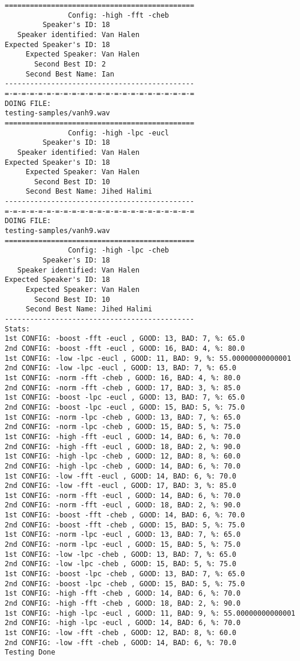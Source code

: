 \begin{verbatim}
=============================================
               Config: -high -fft -cheb
         Speaker's ID: 18
   Speaker identified: Van Halen
Expected Speaker's ID: 18
     Expected Speaker: Van Halen
       Second Best ID: 2
     Second Best Name: Ian
---------------------------------------------
=-=-=-=-=-=-=-=-=-=-=-=-=-=-=-=-=-=-=-=-=-=-=
DOING FILE:
testing-samples/vanh9.wav
=============================================
               Config: -high -lpc -eucl
         Speaker's ID: 18
   Speaker identified: Van Halen
Expected Speaker's ID: 18
     Expected Speaker: Van Halen
       Second Best ID: 10
     Second Best Name: Jihed Halimi
---------------------------------------------
=-=-=-=-=-=-=-=-=-=-=-=-=-=-=-=-=-=-=-=-=-=-=
DOING FILE:
testing-samples/vanh9.wav
=============================================
               Config: -high -lpc -cheb
         Speaker's ID: 18
   Speaker identified: Van Halen
Expected Speaker's ID: 18
     Expected Speaker: Van Halen
       Second Best ID: 10
     Second Best Name: Jihed Halimi
---------------------------------------------
Stats:
1st CONFIG: -boost -fft -eucl , GOOD: 13, BAD: 7, %: 65.0
2nd CONFIG: -boost -fft -eucl , GOOD: 16, BAD: 4, %: 80.0
1st CONFIG: -low -lpc -eucl , GOOD: 11, BAD: 9, %: 55.00000000000001
2nd CONFIG: -low -lpc -eucl , GOOD: 13, BAD: 7, %: 65.0
1st CONFIG: -norm -fft -cheb , GOOD: 16, BAD: 4, %: 80.0
2nd CONFIG: -norm -fft -cheb , GOOD: 17, BAD: 3, %: 85.0
1st CONFIG: -boost -lpc -eucl , GOOD: 13, BAD: 7, %: 65.0
2nd CONFIG: -boost -lpc -eucl , GOOD: 15, BAD: 5, %: 75.0
1st CONFIG: -norm -lpc -cheb , GOOD: 13, BAD: 7, %: 65.0
2nd CONFIG: -norm -lpc -cheb , GOOD: 15, BAD: 5, %: 75.0
1st CONFIG: -high -fft -eucl , GOOD: 14, BAD: 6, %: 70.0
2nd CONFIG: -high -fft -eucl , GOOD: 18, BAD: 2, %: 90.0
1st CONFIG: -high -lpc -cheb , GOOD: 12, BAD: 8, %: 60.0
2nd CONFIG: -high -lpc -cheb , GOOD: 14, BAD: 6, %: 70.0
1st CONFIG: -low -fft -eucl , GOOD: 14, BAD: 6, %: 70.0
2nd CONFIG: -low -fft -eucl , GOOD: 17, BAD: 3, %: 85.0
1st CONFIG: -norm -fft -eucl , GOOD: 14, BAD: 6, %: 70.0
2nd CONFIG: -norm -fft -eucl , GOOD: 18, BAD: 2, %: 90.0
1st CONFIG: -boost -fft -cheb , GOOD: 14, BAD: 6, %: 70.0
2nd CONFIG: -boost -fft -cheb , GOOD: 15, BAD: 5, %: 75.0
1st CONFIG: -norm -lpc -eucl , GOOD: 13, BAD: 7, %: 65.0
2nd CONFIG: -norm -lpc -eucl , GOOD: 15, BAD: 5, %: 75.0
1st CONFIG: -low -lpc -cheb , GOOD: 13, BAD: 7, %: 65.0
2nd CONFIG: -low -lpc -cheb , GOOD: 15, BAD: 5, %: 75.0
1st CONFIG: -boost -lpc -cheb , GOOD: 13, BAD: 7, %: 65.0
2nd CONFIG: -boost -lpc -cheb , GOOD: 15, BAD: 5, %: 75.0
1st CONFIG: -high -fft -cheb , GOOD: 14, BAD: 6, %: 70.0
2nd CONFIG: -high -fft -cheb , GOOD: 18, BAD: 2, %: 90.0
1st CONFIG: -high -lpc -eucl , GOOD: 11, BAD: 9, %: 55.00000000000001
2nd CONFIG: -high -lpc -eucl , GOOD: 14, BAD: 6, %: 70.0
1st CONFIG: -low -fft -cheb , GOOD: 12, BAD: 8, %: 60.0
2nd CONFIG: -low -fft -cheb , GOOD: 14, BAD: 6, %: 70.0
Testing Done
\end{verbatim}
